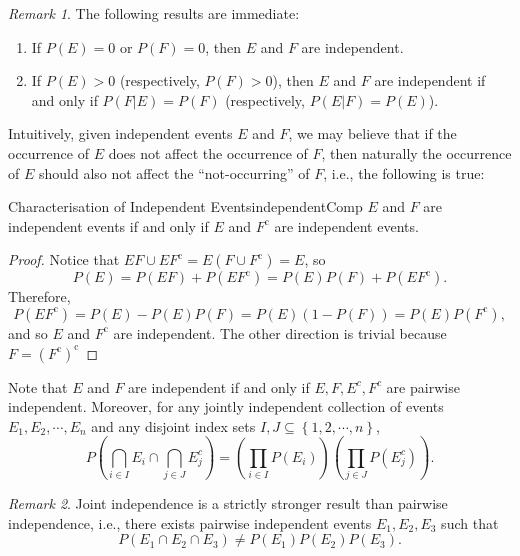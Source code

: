 \documentclass[math]{amznotes}
\theoremstyle{remark}
\newtheorem*{remark}{Remark}
\newcommand{\0}{\mathbf{0}}
\newcommand{\1}{\mathbf{1}}
\begin{document}
\begin{notebox}
    \begin{remark}
        The following results are immediate:
        \begin{enumerate}
            \item If $P(E) = 0$ or $P(F) = 0$, then $E$ and $F$ are independent.
            \item If $P(E) > 0$ (respectively, $P(F) > 0$), then $E$ and $F$ are independent if and only if $P(F|E) = P(F)$ (respectively, $P(E|F) = P(E)$).
        \end{enumerate}
    \end{remark}
\end{notebox}
Intuitively, given independent events $E$ and $F$, we may believe that if the occurrence of $E$ does not affect the occurrence of $F$, then naturally the occurrence of $E$ should also not affect the ``not-occurring'' of $F$, i.e., the following is true:
\begin{probox}{Characterisation of Independent Events}{independentComp}
    $E$ and $F$ are independent events if and only if $E$ and $F^{\mathrm{c}}$ are independent events.
    \tcblower
    \begin{proof}
        Notice that $EF \cup EF^{\mathrm{c}} = E(F \cup F^{\mathrm{c}}) = E$, so
        \begin{equation*}
            P(E) = P(EF) + P(EF^{\mathrm{c}}) = P(E)P(F) + P(EF^{\mathrm{c}}).
        \end{equation*}
        Therefore,
        \begin{equation*}
            P(EF^{\mathrm{c}}) = P(E) - P(E)P(F) = P(E)(1 - P(F)) = P(E)P(F^{\mathrm{c}}),
        \end{equation*}
        and so $E$ and $F^{\mathrm{c}}$ are independent. The other direction is trivial because $F = \left(F^{\mathrm{c}}\right)^{\mathrm{c}}$
    \end{proof}
\end{probox} 
Note that $E$ and $F$ are independent if and only if $E, F, E^c, F^c$ are pairwise independent. Moreover, for any jointly independent collection of events $E_1, E_2, \cdots, E_n$ and any disjoint index sets $I, J \subseteq \left\{1, 2, \cdots, n\right\}$,
\begin{equation*}
    P\left(\bigcap_{i \in I}E_i \cap \bigcap_{j \in J}E_j^c\right) = \left(\prod_{i \in I}P\left(E_i\right)\right)\left(\prod_{j \in J}P\left(E_j^c\right)\right).
\end{equation*}
\begin{notebox}
    \begin{remark}
        Joint independence is a strictly stronger result than pairwise independence, i.e., there exists pairwise independent events $E_1, E_2, E_3$ such that 
        \begin{equation*}
            P\left(E_1 \cap E_2 \cap E_3\right) \neq P\left(E_1\right)P\left(E_2\right)P\left(E_3\right).
        \end{equation*}
    \end{remark}
\end{notebox}
\end{document}

